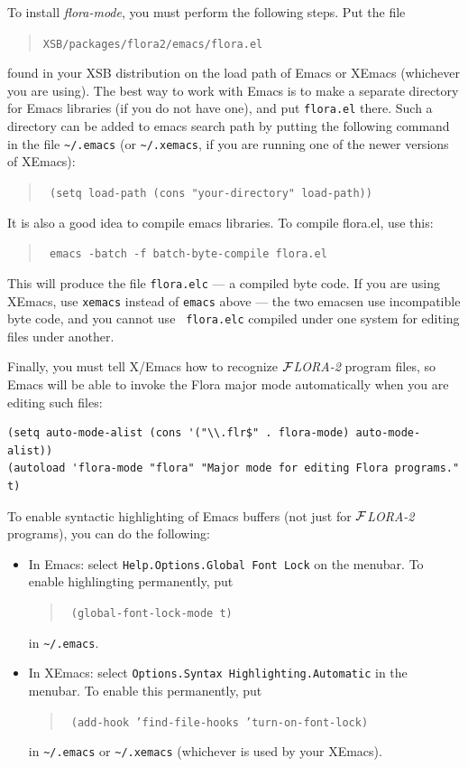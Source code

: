 \documentclass[11pt]{article}
\newcommand{\FLORA}{{\mbox{${\cal F}${\small\it LORA}\rm\emph{-2}}}\xspace}
\begin{document}
To install \emph{flora-mode}, you must perform the following steps. Put the
file
\begin{quote}
  {\tt XSB/packages/flora2/emacs/flora.el} 
\end{quote}
found in your XSB distribution on the load path of Emacs or XEmacs
(whichever you are using). The best way to work with Emacs is to make a
separate directory for Emacs libraries (if you do not have one), and put
{\tt flora.el} there. Such a directory can be added to emacs search path by
putting the following command in the file \verb|~/.emacs| (or
\verb|~/.xemacs|, if you are running one of the newer versions of XEmacs):
\begin{quote}
  \tt
   (setq load-path (cons "your-directory" load-path)) 
\end{quote}
It is also a good idea to compile emacs libraries. To compile flora.el,
use this:
\begin{quote}
  \tt
   emacs -batch -f batch-byte-compile flora.el 
\end{quote}
This will produce the file {\tt flora.elc} --- a compiled byte code.
If you are using XEmacs, use {\tt xemacs} instead of {\tt emacs} above ---
the two emacsen use incompatible byte code, and you cannot use {\tt
  flora.elc} compiled under one system for editing files under another.

Finally, you must tell X/Emacs how to recognize \FLORA program files, so
Emacs will be able to invoke the Flora major mode automatically when you
are editing such files:
\begin{verbatim}
(setq auto-mode-alist (cons '("\\.flr$" . flora-mode) auto-mode-alist))
(autoload 'flora-mode "flora" "Major mode for editing Flora programs." t)
\end{verbatim}

To enable syntactic highlighting of Emacs buffers (not just for \FLORA
programs), you can do the following:
\begin{itemize}
  \item  {\sf In Emacs:} select {\tt Help.Options.Global Font Lock} on
    the menubar.  To enable highlingting permanently, put 
    \begin{quote}
      \tt
      (global-font-lock-mode t)
    \end{quote}
    in \verb|~/.emacs|.
  \item {\sf In XEmacs:} select {\tt Options.Syntax
        Highlighting.Automatic} in the menubar. To enable this permanently, put
      \begin{quote}
        \tt
        (add-hook 'find-file-hooks 'turn-on-font-lock)
      \end{quote}
      in \verb|~/.emacs| or \verb|~/.xemacs| (whichever is used by your
      XEmacs).
\end{itemize}
\end{document}
